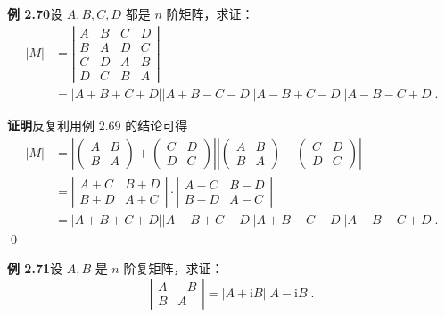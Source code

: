 \documentclass[UTF8,12pt,a4paper,fontset=fandol]{ctexart}
\begin{document}
\noindent\textbf{例 2.70}\quad 设 $A,B,C,D$ 都是 $n$ 阶矩阵，求证：
\[
\begin{aligned}
|M|
&=
\left|
\begin{array}{cccc}
A & B & C & D\\
B & A & D & C\\
C & D & A & B\\
D & C & B & A
\end{array}
\right|\\
&=|A+B+C+D||A+B-C-D||A-B+C-D||A-B-C+D|.
\end{aligned}
\]

\noindent\textbf{证明}\quad 反复利用例 2.69 的结论可得
\[
\begin{aligned}
|M|
&=
\left|
\left(
\begin{array}{cc}
A & B\\
B & A
\end{array}
\right)
+
\left(
\begin{array}{cc}
C & D\\
D & C
\end{array}
\right)
\right|
\left|
\left(
\begin{array}{cc}
A & B\\
B & A
\end{array}
\right)
-
\left(
\begin{array}{cc}
C & D\\
D & C
\end{array}
\right)
\right|\\
&=
\left|
\begin{array}{cc}
A+C & B+D\\
B+D & A+C
\end{array}
\right|
\cdot
\left|
\begin{array}{cc}
A-C & B-D\\
B-D & A-C
\end{array}
\right|\\
&=|A+B+C+D||A-B+C-D||A+B-C-D||A-B-C+D|.
\end{aligned}
\]
\qed

\noindent\textbf{例 2.71}\quad 设 $A,B$ 是 $n$ 阶复矩阵，求证：
\[
\left|
\begin{array}{cc}
A & -B\\
B & A
\end{array}
\right|
=|A+\mathrm iB||A-\mathrm iB|.
\]
\end{document}
